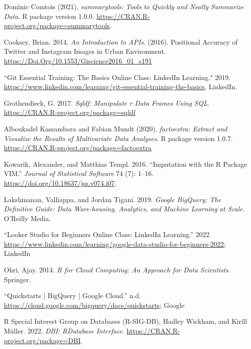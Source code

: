 \documentclass[12pt,longbibliography]{article}
\theoremstyle{definition}
\theoremstyle{remark}
\begin{document}
\newpage

\nocite{*}

\newpage 

\begin{thebibliography}{99} 


 Dominic Comtois (2021). \textit{summarytools: Tools to Quickly and Neatly Summarize Data}. R package version 1.0.0. \url{https://CRAN.R-project.org/package=summarytools}.

 Cooksey, Brian. 2014. \textit{An Introduction to APIs}. (2016). Positional Accuracy of Twitter and Instagram Images in Urban Environment. \url{https://Doi.Org/10.1553/Giscience2016_01_s191}

 “Git Essential Training: The Basics Online Class: LinkedIn Learning." 2019. \url{https://www.linkedin.com/learning/git-essential-training-the-basics}, LinkedIn. 

 Grothendieck, G. 2017. \textit{Sqldf:  Manipulate r Data Frames Using SQL}. \url{https://CRAN.R-project.org/package=sqldf}

 Alboukadel Kassambara and Fabian Mundt (2020). \textit{factoextra: Extract and Visualize the Results of Multivariate Data Analyses}. R package version 1.0.7. \url{https://CRAN.R-project.org/package=factoextra}

 Kowarik, Alexander, and Matthias Templ. 2016. “Imputation with the R Package VIM.” \textit{Journal of Statistical Software }74 (7): 1–16. \url{https://doi.org/10.18637/jss.v074.i07}.

 Lakshmanan, Valliappa, and Jordan Tigani. 2019. \textit{Google BigQuery: The Definitive Guide: Data Ware-housing, Analytics, and Machine Learning at Scale.} O’Reilly Media.

 “Looker Studio for Beginners Online Class: LinkedIn Learning.” 2022. \url{https://www.linkedin.com/learning/google-data-studio-for-beginners-2022}; LinkedIn

 Ohri, Ajay. 2014. \textit{R for Cloud Computing: An Approach for Data Scientists}. Springer.

“Quickstarts | BigQuery | Google Cloud.” n.d. \url{https://cloud.google.com/bigquery/docs/quickstarts}; Google

R Special Interest Group on Databases (R-SIG-DB), Hadley Wickham, and Kirill Müller. 2022. \textit{DBI: RDatabase Interface}. \url{https://CRAN.R-project.org/package=DBI}.


\end{thebibliography}
\end{document}
